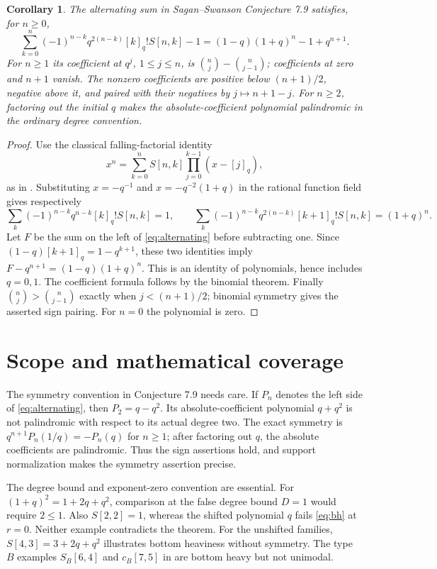 \documentclass[11pt]{article}
\newtheorem{corollary}[lemma]{Corollary}
\newcommand{\qi}[1]{[#1]_q}
\begin{document}
\begin{corollary}\label{cor:alternating}
The alternating sum in Sagan--Swanson Conjecture 7.9 satisfies, for $n\ge0$,
\begin{equation}\label{eq:alternating}
 \sum_{k=0}^n(-1)^{n-k}q^{2(n-k)}\qi{k}!S[n,k]-1
   =(1-q)(1+q)^n-1+q^{n+1}.
\end{equation}
For $n\ge1$ its coefficient at $q^j$, $1\le j\le n$, is
$\binom nj-\binom n{j-1}$; coefficients at zero and $n+1$ vanish.
The nonzero coefficients are positive below $(n+1)/2$, negative above
it, and paired with their negatives by $j\mapsto n+1-j$.
For $n\ge2$, factoring out the initial $q$ makes the absolute-coefficient
polynomial palindromic in the ordinary degree convention.
\end{corollary}
\begin{proof}
Use the classical falling-factorial identity
\[
 x^n=\sum_{k=0}^n S[n,k]\prod_{j=0}^{k-1}(x-\qi j),
\]
as in \cite[equation (3.12)]{DZ}. Substituting $x=-q^{-1}$
and $x=-q^{-2}(1+q)$ in the rational function field gives respectively
\[
 \sum_k(-1)^{n-k}q^{n-k}\qi{k}!S[n,k]=1,\qquad
 \sum_k(-1)^{n-k}q^{2(n-k)}\qi{k+1}!S[n,k]=(1+q)^n.
\]
Let $F$ be the sum on the left of \eqref{eq:alternating} before
subtracting one. Since $(1-q)\qi{k+1}=1-q^{k+1}$, these two
identities imply $F-q^{n+1}=(1-q)(1+q)^n$.
This is an identity of polynomials, hence includes $q=0,1$.
The coefficient formula follows by the binomial theorem. Finally
$\binom nj>\binom n{j-1}$ exactly when $j<(n+1)/2$;
binomial symmetry gives the asserted sign pairing. For $n=0$ the
polynomial is zero.
\end{proof}

\section{Scope and mathematical coverage}
The symmetry convention in Conjecture 7.9 needs care. If $P_n$ denotes
the left side of \eqref{eq:alternating}, then $P_2=q-q^2$.
Its absolute-coefficient polynomial $q+q^2$ is not palindromic
with respect to its actual degree two. The exact symmetry is
$q^{n+1}P_n(1/q)=-P_n(q)$ for $n\ge1$; after factoring out $q$,
the absolute coefficients are palindromic. Thus the sign assertions
hold, and support normalization makes the symmetry assertion precise.

The degree bound and exponent-zero convention are essential.
For $(1+q)^2=1+2q+q^2$, comparison at the false degree bound $D=1$
would require $2\le1$.
Also $S[2,2]=1$, whereas the shifted polynomial $q$ fails
\eqref{eq:bh} at $r=0$. Neither example contradicts the theorem.
For the unshifted families, $S[4,3]=3+2q+q^2$ illustrates bottom
heaviness without symmetry. The type $B$ examples $S_B[6,4]$ and
$c_B[7,5]$ in \cite[Section 7.5]{SS} are bottom heavy but not unimodal.
\end{document}
